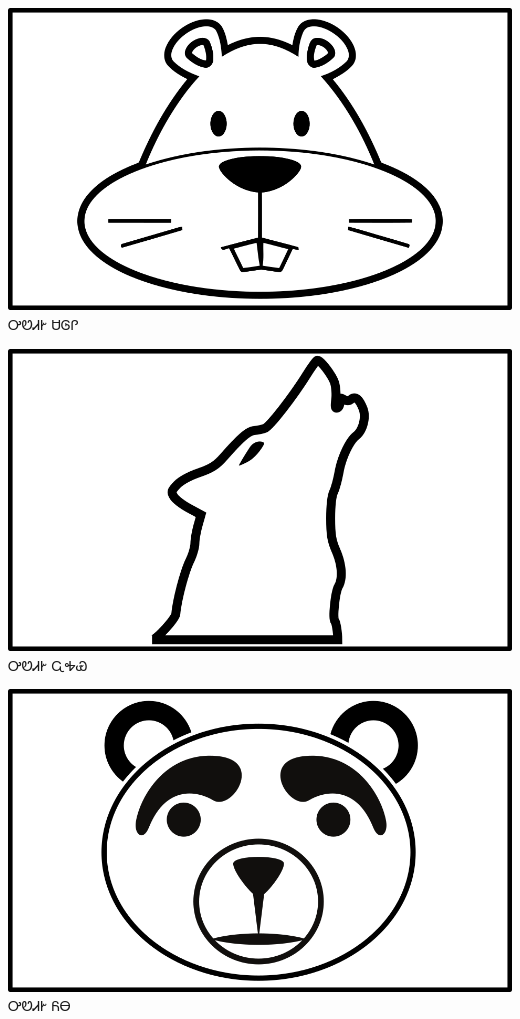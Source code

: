 \documentclass[avery5371]{flashcards}%
\begin{document}
    \begin{flashcard}{
        \includegraphics[width=0.95\columnwidth,height=.51\columnwidth,keepaspectratio]{../artwork/objects-animate/saloli}
    }
        \Huge ᎤᏬᏗᎨ ᏌᎶᎵ
    \end{flashcard}

    \begin{flashcard}{
        \includegraphics[width=0.95\columnwidth,height=.51\columnwidth,keepaspectratio]{../artwork/objects-animate/wahya}
    }
        \Huge ᎤᏬᏗᎨ ᏩᎭᏯ
    \end{flashcard}

    \begin{flashcard}{
        \includegraphics[width=0.95\columnwidth,height=.51\columnwidth,keepaspectratio]{../artwork/objects-animate/yona}
    }
        \Huge ᎤᏬᏗᎨ ᏲᎾ
    \end{flashcard}
\end{document}
